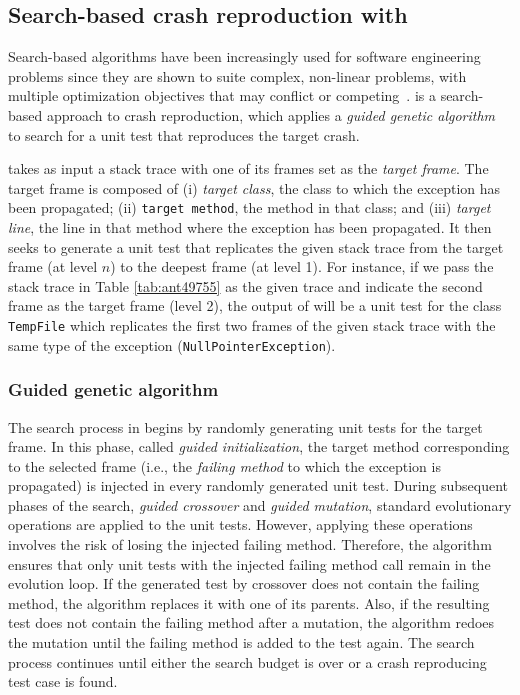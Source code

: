 \subsection{Search-based crash reproduction with \evocrash}

Search-based algorithms have been increasingly used for software engineering problems since they are shown to suite complex, non-linear problems, with multiple optimization objectives that may conflict or competing~\cite{harman12trends}.
\evocrash \cite{soltani2017, Soltani2018a} is a search-based approach to crash reproduction, which applies a \textit{guided genetic algorithm} to search for a unit test that reproduces the target crash.

\evocrash takes as input a stack trace with one of its frames set as the \emph{target frame}. 
The target frame is composed of 
(i) \emph{target class}, the class to which the exception has been propagated;
(ii) \texttt{target method}, the method in that class; and 
(iii) \emph{target line}, the line in that method where the exception has been propagated. 
It then seeks to generate a unit test that replicates the given stack trace from the target frame (at level $n$) to the deepest frame (at level 1). 
For instance, if we pass the stack trace in Table \ref{tab:ant49755} as the given trace and indicate the second frame as the target frame (level 2), the output of \evocrash will be a unit test for the class \texttt{TempFile} which replicates the first two frames of the given stack trace with the same type of the exception (\texttt{NullPointerException}).

\subsubsection{Guided genetic algorithm}

The search process in \evocrash begins by randomly generating unit tests for the target frame.
In this phase, called \emph{guided initialization}, the target method corresponding to the selected frame (i.e., the \emph{failing method} to which the exception is propagated) is injected in every randomly generated unit test.
During subsequent phases of the search, \emph{guided crossover} and \emph{guided mutation}, standard evolutionary operations are applied to the unit tests.
However, applying these operations involves the risk of losing the injected failing method.
Therefore, the algorithm ensures that only unit tests with the injected failing method call remain in the evolution loop. 
If the generated test by crossover does not contain the failing method, the algorithm replaces it with one of its parents. 
Also, if the resulting test does not contain the failing method after a mutation, the algorithm redoes the mutation until the failing method is added to the test again.
The search process continues until either the search budget is over or a crash reproducing test case is found.

